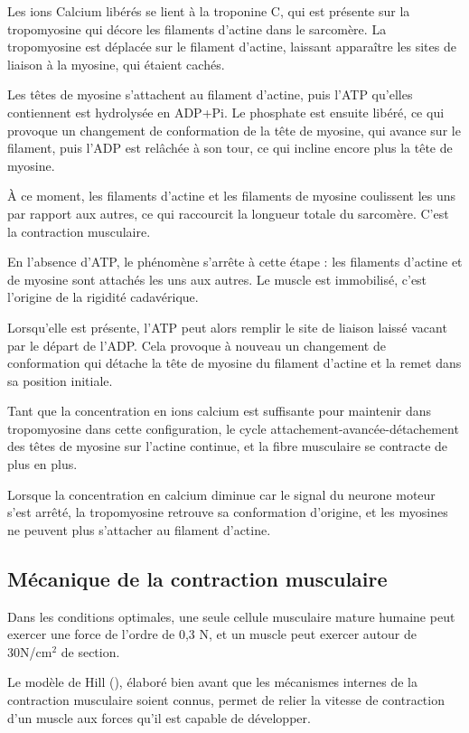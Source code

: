 Les ions Calcium libérés se lient à la troponine C, qui est présente sur la tropomyosine qui décore les filaments d'actine dans le sarcomère. La tropomyosine est déplacée sur le filament d'actine, laissant apparaître les sites de liaison à la myosine, qui étaient cachés. 

Les têtes de myosine s'attachent au filament d'actine, puis l'ATP qu'elles contiennent est hydrolysée en ADP+Pi. Le phosphate est ensuite libéré, ce qui provoque un changement de conformation de la tête de myosine, qui avance sur le filament, puis l'ADP est relâchée à son tour, ce qui incline encore plus la tête de myosine. 

À ce moment, les filaments d'actine et les filaments de myosine coulissent les uns par rapport aux autres, ce qui raccourcit la longueur totale du sarcomère. C'est la contraction musculaire. 

En l'absence d'ATP, le phénomène s'arrête à cette étape : les filaments d'actine et de myosine sont attachés les uns aux autres. Le muscle est immobilisé, c'est l'origine de la rigidité cadavérique. 

Lorsqu'elle est présente, l'ATP peut alors remplir le site de liaison laissé vacant par le départ de l'ADP. Cela provoque à nouveau un changement de conformation qui détache la tête de myosine du filament d'actine et la remet dans sa position initiale.

Tant que la concentration en ions calcium est suffisante pour maintenir dans tropomyosine dans cette configuration, le cycle attachement-avancée-détachement des têtes de myosine sur l'actine continue, et la fibre musculaire se contracte de plus en plus. 

Lorsque la concentration en calcium diminue car le signal du neurone moteur s'est arrêté, la tropomyosine retrouve sa conformation d'origine, et les myosines ne peuvent plus s'attacher au filament d'actine. 


\subsection{Mécanique de la contraction musculaire}
Dans les conditions optimales, une seule cellule musculaire mature humaine peut exercer une force de l'ordre de 0,3 \micro N, et un muscle peut exercer autour de 30N/cm$^2$ de section. 

Le modèle de Hill (\cite{hill_heat_1938}), élaboré bien avant que les mécanismes internes de la contraction musculaire soient connus, permet de relier la vitesse de contraction d'un muscle aux forces qu'il est capable de développer. 

